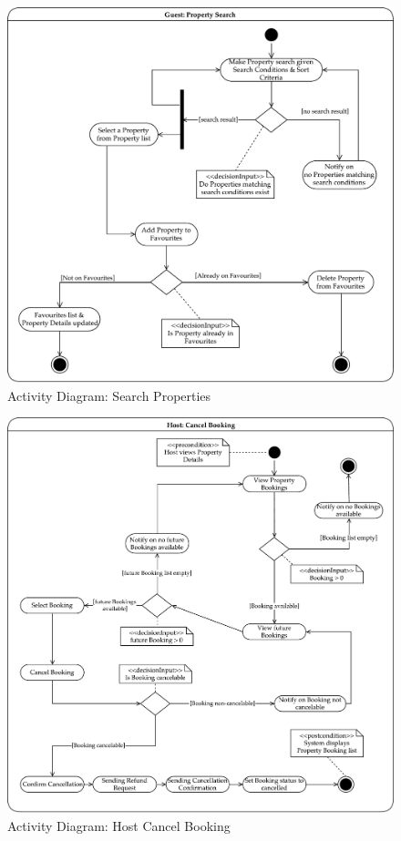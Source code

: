 \begin{figure}[H]
    \centering
    \includegraphics[width=17cm]{img/activity/search.pdf}
    \caption{Activity Diagram: Search Properties\protect\footnotemark}
    \label{activity_diagram_3}
\end{figure}
\begin{figure}[H]
    \centering
    \includegraphics[width=17cm]{img/activity/cancel_booking.pdf}
    \caption{Activity Diagram: Host Cancel Booking}
    \label{activity_diagram_4}
\end{figure}

